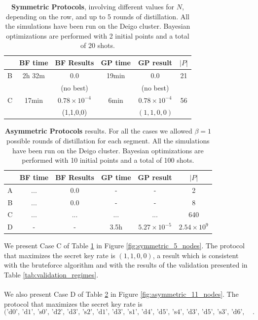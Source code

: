 \documentclass{article}
\begin{document}
\begin{table}[ht]
    \centering
    \begin{tabular}{|c|c|c|c|c|c|}
        \hline
        & BF time & BF Results & GP time & GP result & $|P|$ \\
        \hline
        \hline
        B & 2h 32m & 0.0 & 19min & 0.0 & 21 \\
        & & (no best) & & (no best) & \\
        \hline
        C & 17min & $0.78 \times 10^{-4}$ & 6min & $0.78 \times 10^{-4}$ & 56 \\
        & & (1,1,0,0) & & $(1,1,0,0)$ & \\
        \hline
    \end{tabular}
    \caption{\textbf{Symmetric Protocols}, involving different values for $N$, depending on the row, and up to 5 rounds of distillation. All the simulations have been run on the Deigo cluster. Bayesian optimizations are performed with 2 initial points and a total of 20 shots.}
    \label{tab:symmetric_protocols}
\end{table}

\begin{table}[ht]
    \centering
    \begin{tabular}{|c|c|c|c|c|c|}
        \hline
        & BF time & BF Results & GP time & GP result & $|P|$ \\
        \hline
        \hline
        A & ... & 0.0 & - & - & 2 \\
        \hline
        B & ... & 0.0 & - & - & 8 \\
        \hline
        C & ... & ... & ... & ... & 640 \\
        \hline
        D & - & - & 3.5h & $5.27 \times 10^{-5}$ & $2.54 \times 10^9$ \\
        \hline
    \end{tabular}
    \caption{\textbf{Asymmetric Protocols} results. For all the cases we allowed $\beta=1$ possible rounds of distillation for each segment. All the simulations have been run on the Deigo cluster. Bayesian optimizations are performed with 10 initial points and a total of 100 shots.}
    \label{tab:asymmetric_protocols}
\end{table}

We present Case C of Table \ref{tab:symmetric_protocols} in Figure \ref{fig:symmetric_5_nodes}. The protocol that maximizes the secret key rate is $(1,1,0,0)$, a result which is consistent with the bruteforce algorithm and with the results of the validation presented in Table \ref{tab:validation_regimes}.
\\\\
We also present Case D of Table \ref{tab:asymmetric_protocols} in Figure \ref{fig:asymmetric_11_nodes}. The protocol that maximizes the secret key rate is 
\begin{equation*}
  \text{('d0', 'd1', 's0', 'd2', 'd3', 's2', 'd1', 'd3', 's1', 'd4', 'd5', 's4', 'd3', 'd5', 's3', 'd6', 'd7', 's6', 'd8', 'd9', 's8', 'd7', 'd9', 's7', 'd5', 'd9', 's5')} . 
\end{equation*}
\end{document}
